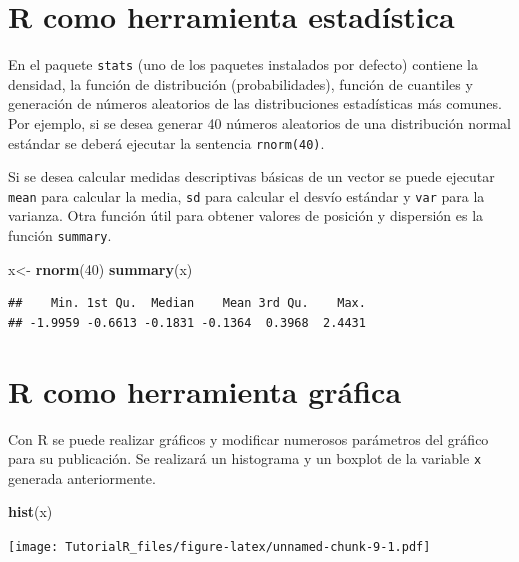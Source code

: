 \documentclass[]{book}
\newenvironment{Shaded}{\begin{snugshade}}{\end{snugshade}}
\newcommand{\KeywordTok}[1]{\textcolor[rgb]{0.13,0.29,0.53}{\textbf{#1}}}
\newcommand{\DecValTok}[1]{\textcolor[rgb]{0.00,0.00,0.81}{#1}}
\newcommand{\StringTok}[1]{\textcolor[rgb]{0.31,0.60,0.02}{#1}}
\newcommand{\NormalTok}[1]{#1}
\begin{document}
\section{R como herramienta
estadística}\label{r-como-herramienta-estadistica}

En el paquete \texttt{stats} (uno de los paquetes instalados por
defecto) contiene la densidad, la función de distribución
(probabilidades), función de cuantiles y generación de números
aleatorios de las distribuciones estadísticas más comunes. Por ejemplo,
si se desea generar 40 números aleatorios de una distribución normal
estándar se deberá ejecutar la sentencia \texttt{rnorm(40)}.

Si se desea calcular medidas descriptivas básicas de un vector se puede
ejecutar \texttt{mean} para calcular la media, \texttt{sd} para calcular
el desvío estándar y \texttt{var} para la varianza. Otra función útil
para obtener valores de posición y dispersión es la función
\texttt{summary}.

\begin{Shaded}
\begin{Highlighting}[]
\NormalTok{x<-}\StringTok{ }\KeywordTok{rnorm}\NormalTok{(}\DecValTok{40}\NormalTok{)}
\KeywordTok{summary}\NormalTok{(x)}
\end{Highlighting}
\end{Shaded}

\begin{verbatim}
##    Min. 1st Qu.  Median    Mean 3rd Qu.    Max. 
## -1.9959 -0.6613 -0.1831 -0.1364  0.3968  2.4431
\end{verbatim}

\section{R como herramienta gráfica}\label{r-como-herramienta-grafica}

Con R se puede realizar gráficos y modificar numerosos parámetros del
gráfico para su publicación. Se realizará un histograma y un boxplot de
la variable \texttt{x} generada anteriormente.

\begin{Shaded}
\begin{Highlighting}[]
\KeywordTok{hist}\NormalTok{(x)}
\end{Highlighting}
\end{Shaded}

\texttt{[image: TutorialR\_files/figure-latex/unnamed-chunk-9-1.pdf]}
\end{document}

